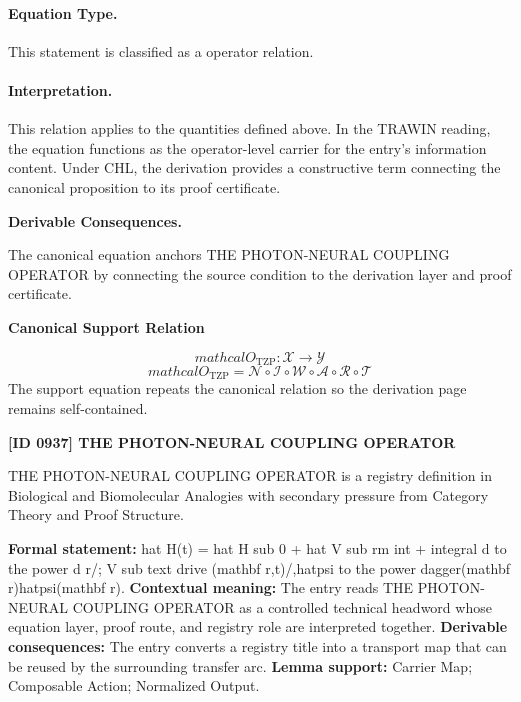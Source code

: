 \paragraph{Equation Type.}
This statement is classified as a operator relation.

\paragraph{Interpretation.}
This relation applies to the quantities defined above. In the TRAWIN reading, the equation functions as the operator-level carrier for the entry’s information content. Under CHL, the derivation provides a constructive term connecting the canonical proposition to its proof certificate.

\par\vspace{0.35em}
\noindent\textbf{Derivable Consequences.}\quad
\begingroup
\footnotesize
\raggedright
The canonical equation anchors THE PHOTON-NEURAL COUPLING OPERATOR by connecting the source condition to the derivation layer and proof certificate.
\par\endgroup

\noindent\textbf{Canonical Support Relation}\par
\[
mathcal{O}_{\mathrm{TZP}} : \mathcal{X} \to \mathcal{Y}
\]
\[
mathcal{O}_{\mathrm{TZP}} = \mathcal{N}\circ \mathcal{I}\circ \mathcal{W}\circ \mathcal{A}\circ \mathcal{R}\circ \mathcal{T}
\]
\noindent The support equation repeats the canonical relation so the derivation page remains self-contained.\par

\clearpage
\noindent\textbf{[ID 0937] THE PHOTON-NEURAL COUPLING OPERATOR}\par
\vspace{0.35em}
\begingroup\small
{}
THE PHOTON-NEURAL COUPLING OPERATOR is a registry definition in Biological and Biomolecular Analogies with secondary pressure from Category Theory and Proof Structure.

\begingroup\footnotesize\setlength{\emergencystretch}{3em}\sloppy
\textbf{Formal statement:} hat H(t) = hat H sub 0 + hat V sub rm int + integral d to the power d r/; V sub text drive (mathbf r,t)/,hatpsi to the power dagger(mathbf r)hatpsi(mathbf r). \textbf{Contextual meaning:} The entry reads THE PHOTON-NEURAL COUPLING OPERATOR as a controlled technical headword whose equation layer, proof route, and registry role are interpreted together. \textbf{Derivable consequences:} The entry converts a registry title into a transport map that can be reused by the surrounding transfer arc. \textbf{Lemma support:} Carrier Map; Composable Action; Normalized Output.\par
\endgroup

